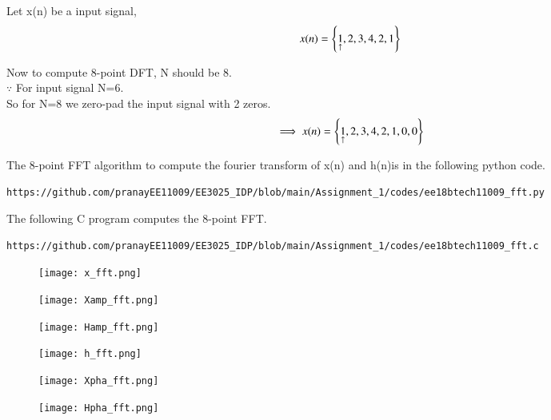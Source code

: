 \documentclass[journal,12pt,twocolumn]{IEEEtran}
\renewcommand\thesection{\arabic{section}}
\begin{document}
\begin{enumerate}[label=\thesection.\arabic*.,ref=\thesection.\theenumi]
Let x(n) be a input signal,
\begin{align}
    x(n) = \left\{\underset{\uparrow}{1},2,3,4,2,1\right\} 
\end{align}

Now to compute 8-point DFT, N should be 8. \\
$\because$ For input signal N=6.\\
So for N=8 we zero-pad the input signal with 2 zeros.\\
\begin{align}
    \implies x(n) = \left\{\underset{\uparrow}{1},2,3,4,2,1,0,0\right\} 
\end{align}

The 8-point FFT algorithm to compute the fourier transform of x(n) and h(n)is in the following python code.
\begin{lstlisting}
https://github.com/pranayEE11009/EE3025_IDP/blob/main/Assignment_1/codes/ee18btech11009_fft.py
\end{lstlisting}

\bigskip
The following C program computes the 8-point FFT.
\begin{lstlisting}
https://github.com/pranayEE11009/EE3025_IDP/blob/main/Assignment_1/codes/ee18btech11009_fft.c
\end{lstlisting}
\newpage

\begin{figure}[h!]
    \centering
    \texttt{[image: x\_fft.png]}
    \label{figs}
\end{figure}

\begin{figure}[h!]
    \centering
    \texttt{[image: Xamp\_fft.png]}
    \label{figs}
\end{figure}

\begin{figure}[h!]
    \centering
    \texttt{[image: Hamp\_fft.png]}
    \label{figs}
\end{figure}

\begin{figure}[h!]
    \centering
    \texttt{[image: h\_fft.png]}
    \label{figs}
\end{figure}
\vspace{1cm}
\begin{figure}[h!]
    \centering
    \texttt{[image: Xpha\_fft.png]}
    \label{figs}
\end{figure}

\begin{figure}[h!]
    \centering
    \texttt{[image: Hpha\_fft.png]}
    \label{figs}
\end{figure}
\end{enumerate}
\end{document}
